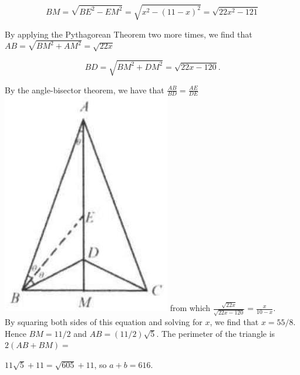 \documentclass{article}
\begin{document}
\[
B M=\sqrt{B E^{2}-E M^{2}}=\sqrt{x^{2}-(11-x)^{2}}=\sqrt{22 x^{2}-121}
\]

By applying the Pythagorean Theorem two more times, we find that \(A B=\sqrt{B M^{2}+A M^{2}}=\sqrt{22 x}\)

\[
B D=\sqrt{B M^{2}+D M^{2}}=\sqrt{22 x-120} .
\]

By the angle-bisector theorem, we have that \(\frac{A B}{B D}=\frac{A E}{D E}\)\\
\includegraphics[width=\textwidth]{images/070(1).jpg} from which \(\frac{\sqrt{22 x}}{\sqrt{22 x-120}}=\frac{x}{10-x}\).\\
By squaring both sides of this equation and solving for \(x\), we find that \(x=55 / 8\). Hence \(B M=11 / 2\) and \(A B=(11 / 2) \sqrt{5}\). The perimeter of the triangle is \(2(A B+B M)=\)


\(11 \sqrt{5}+11=\sqrt{605}+11\), so \(a+b=616\).
\end{document}
